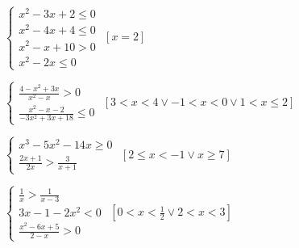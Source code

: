 \begin{esercizio}[\Ast]
\begin{enumeratea}
\item $\left\{\begin{array}{l}
           x^2-3x+2\le 0\\
           x^2-4x+4\le 0\\
           x^2-x+10>0\\
           x^2-2x\le 0 \end{array}\right.$
 \hfill $\left[x=2\right]$
\item $\left\{\begin{array}{l}
           \frac{4-x^2+3x}{x^2-x}>0 \\
           \frac{x^2-x-2}{-3x^2+3x+18} \le 0 \end{array}\right.$
 \hfill $\left[3<x<4\vee -1<x<0\vee 1<x\le 2\right]$
\item $\left\{\begin{array}{l}
           x^3-5x^2-14x\ge 0 \\ 
           \frac{2x+1}{2x} > \frac 3{x+1}\end{array}\right.$
 \hfill $\left[2\le x<-1\vee x\ge 7\right]$
\item $\left\{\begin{array}{l}
           \frac 1 x>\frac 1{x-3}\\3x-1-2x^2<0\\
           \frac{x^2-6x+5}{2-x}>0 \end{array}\right.$
 \hfill $\left[0<x<\frac 1 2\vee 2<x<3\right]$
 \end{enumeratea}
\end{esercizio}

